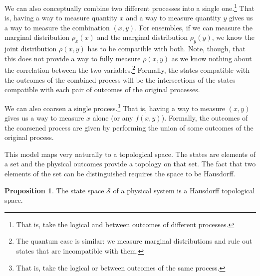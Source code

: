 \documentclass[smallextended]{svjour3}
\numberwithin{equation}{section}
\theoremstyle{definition}
\newtheorem{prop}[equation]{Proposition}
\begin{document}
We can also conceptually combine two different processes into a single one.\footnote{That is, take the logical and between outcomes of different processes.} That is, having a way to measure quantity $x$ and a way to measure quantity $y$ gives us a way to measure the combination $(x,y)$. For ensembles, if we can measure the marginal distribution $\rho_x(x)$ and the marginal distribution $\rho_y(y)$, we know the joint distribution $\rho(x,y)$ has to be compatible with both. Note, though, that this does not provide a way to fully measure $\rho(x,y)$ as we know nothing about the correlation between the two variables.\footnote{The quantum case is similar: we measure marginal distributions and rule out states that are incompatible with them.} Formally, the states compatible with the outcomes of the combined process will be the intersections of the states compatible with each pair of outcomes of the original processes.

We can also coarsen a single process.\footnote{That is, take the logical or between outcomes of the same process.} That is, having a way to measure $(x,y)$ gives us a way to measure $x$ alone (or any $f(x,y)$). Formally, the outcomes of the coarsened process are given by performing the union of some outcomes of the original process.

This model maps very naturally to a topological space. The states are elements of a set and the physical outcomes provide a topology on that set. The fact that two elements of the set can be distinguished requires the space to be Hausdorff.

\begin{prop}\label{prop:state_topology}
The state space $\mathcal{S}$ of a physical system is a Hausdorff topological space.
\end{prop}
\end{document}

